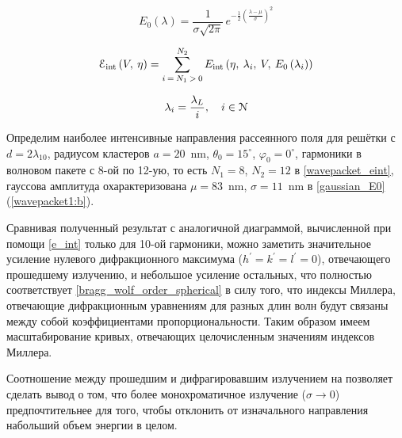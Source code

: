     \begin{equation}
        E_0 \left( \lambda \right) = \frac{1}{\sigma\sqrt{2\pi}}\,e^{-\frac{1}{2}{\left(\frac{\lambda - \mu}{\sigma}\right)}^2}\label{gaussian_E0}
    \end{equation}

    \begin{equation}
        \EuScript{E}_{\textrm{int}} \left(V, \:\eta\right) = \sum\limits_{i\:=\:N_1\:>\:0}^{N_2}{E_{\textrm{int}} \left( \eta,\:\lambda_{i}, \:V, \:E_0 \left( \lambda_{i} \right) \right)}
        \label{wavepacket_eint}
    \end{equation}

    \begin{equation*}
        \lambda_{i} = \frac{\lambda_{L}}{i}, \quad i \in \EuScript{N}\label{wavepacket_lambdas}
    \end{equation*}

Определим наиболее интенсивные направления рассеянного поля для решётки с $d = 2\lambda_{10}$, радиусом кластеров $a = 20$~nm, $\theta_0 = 15^\circ$, $\varphi_0 = 0^\circ$, гармоники в волновом пакете с 8-ой по 12-ую, то есть $N_1 = 8$, $N_2 = 12$ в \autoref{wavepacket_eint}, гауссова амплитуда охарактеризована $\mu = 83$~nm, $\sigma = 11$~nm в \autoref{gaussian_E0} (\autoref{wavepacket1:b}). 

Сравнивая полученный результат с аналогичной диаграммой, вычисленной при помощи \autoref{e_int} только для 10-ой гармоники, можно заметить значительное усиление нулевого дифракционного максимума ($h^\prime = k^\prime = l^\prime = 0$), отвечающего прошедшему излучению, и небольшое усиление остальных, что полностью соответствует \autoref{bragg_wolf_order_spherical} в силу того, что индексы Миллера, отвечающие дифракционным уравнениям для разных длин волн будут связаны между собой коэффициентами пропорциональности. Таким образом имеем масштабирование кривых, отвечающих целочисленным значениям индексов Миллера.

Соотношение между прошедшим и дифрагировавшим излучением на  позволяет сделать вывод о том, что более монохроматичное излучение ($\sigma \to 0$) предпочтительнее для того, чтобы отклонить от изначального направления набольший объем энергии в целом.


